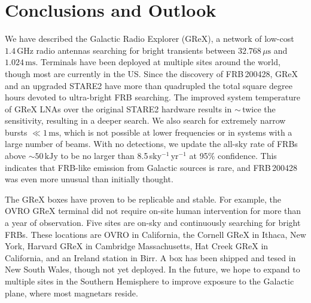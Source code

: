 \section{Conclusions and Outlook} \label{sec:conclusions}
We have described the Galactic Radio Explorer (GReX), a network of low-cost $1.4\,\text{GHz}$ radio antennas searching for bright transients between $32.768\,\mu\text{s}$ and $1.024\,\text{ms}$.
Terminals have been deployed at multiple sites around the world, though most are currently in the US.
Since the discovery of FRB\,200428, GReX and an upgraded STARE2 have more than quadrupled the total square degree hours devoted to ultra-bright FRB searching.
The improved system temperature of GReX LNAs over the original STARE2 hardware results in $\sim$\,twice the sensitivity, resulting in a deeper search.
We also search for extremely narrow bursts $\ll1\,\text{ms}$, which is not possible at lower frequencies or in systems with a large number of beams.
With no detections, we update the all-sky rate of FRBs above $\sim50\,\text{kJy}$ to be no larger than 8.5\,sky$^{-1}$\,yr$^{-1}$ at 95$\%$ confidence.
This indicates that FRB-like emission from Galactic sources is rare, and FRB\,200428 was even more unusual than initially thought. 

The GReX boxes have proven to be replicable and stable.
For example, the OVRO GReX terminal did not require on-site human intervention for more than a year of observation. Five sites are on-sky and continuously searching for bright FRBs.
These locations are  OVRO in California, the Cornell GReX in Ithaca, New York, Harvard GReX in Cambridge Massachusetts, Hat Creek GReX in California, and an Ireland station in Birr.
A box has been shipped and tesed in New South Wales, though not yet deployed.
In the future, we hope to expand to multiple sites in the Southern Hemisphere to improve exposure to the Galactic plane, where most magnetars reside. 
